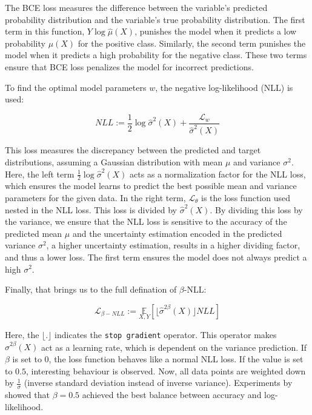 The BCE loss measures the difference between the variable's predicted probability distribution and the variable's true probability distribution. The first term in this function, $Y \log \hat{\mu}(X)$, punishes the model when it predicts a low probability $\mu(X)$ for the positive class. Similarly, the second term punishes the model when it predicts a high probability for the negative class. These two terms ensure that BCE loss penalizes the model for incorrect predictions.

To find the optimal model parameters $w$, the negative log-likelihood (NLL) is used:

\begin{equation}
    NLL := \frac{1}{2}\log \hat{\sigma}^2(X) + \frac{\mathcal{L}_w}{\hat{\sigma}^2(X)}
\end{equation}

This loss measures the discrepancy between the predicted and target distributions, assuming a Gaussian distribution with mean $\mu$ and variance $\sigma^2$. Here, the left term $\frac{1}{2}\log \hat{\sigma}^2(X)$ acts as a normalization factor for the NLL loss, which ensures the model learns to predict the best possible mean and variance parameters for the given data. In the right term, $\mathcal{L}_\theta$ is the loss function used nested in the NLL loss. This loss is divided by $\hat{\sigma}^2(X)$. By dividing this loss by the variance, we ensure that the NLL loss is sensitive to the accuracy of the predicted mean $\mu$ and the uncertainty estimation encoded in the predicted variance $\sigma^2$, a higher uncertainty estimation, results in a higher dividing factor, and thus a lower loss. The first term ensures the model does not always predict a high $\sigma^2$.

Finally, that brings us to the full defination of $\beta$-NLL:


\begin{equation}
    \mathcal{L}_{\beta-NLL} := \underset{X, Y}{\mathbb{E}} \left[ \lfloor \hat{\sigma}^{2\beta}(X) \rfloor NLL \right]
\end{equation}

Here, the $\lfloor. \rfloor$ indicates the \verb|stop gradient| operator. This operator makes $\hat{\sigma}^{2\beta}(X)$ act as a learning rate, which is dependent on the variance prediction. If $\beta$ is set to 0, the loss function behaves like a normal NLL loss. If the value is set to $0.5$, interesting behaviour is observed. Now, all data points are weighted down by $\frac{1}{\sigma}$ (inverse standard deviation instead of inverse variance). Experiments by \cite{seitzer2022pitfalls} showed that $\beta = 0.5$ achieved the best balance between accuracy and log-likelihood.

